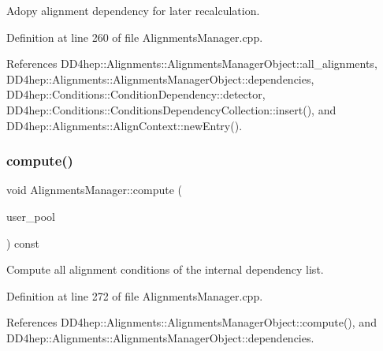 Adopy alignment dependency for later recalculation. 



Definition at line 260 of file Alignments\+Manager.\+cpp.



References D\+D4hep\+::\+Alignments\+::\+Alignments\+Manager\+Object\+::all\+\_\+alignments, D\+D4hep\+::\+Alignments\+::\+Alignments\+Manager\+Object\+::dependencies, D\+D4hep\+::\+Conditions\+::\+Condition\+Dependency\+::detector, D\+D4hep\+::\+Conditions\+::\+Conditions\+Dependency\+Collection\+::insert(), and D\+D4hep\+::\+Alignments\+::\+Align\+Context\+::new\+Entry().

\hypertarget{class_d_d4hep_1_1_alignments_1_1_alignments_manager_acc151cb6bf84d9113f6fe02463ad7c3e}{}\label{class_d_d4hep_1_1_alignments_1_1_alignments_manager_acc151cb6bf84d9113f6fe02463ad7c3e} 
\subsubsection{\texorpdfstring{compute()}{compute()}\hspace{0.1cm}{\footnotesize\ttfamily [1/2]}}
{\footnotesize\ttfamily void Alignments\+Manager\+::compute (\begin{DoxyParamCaption}\item[{\hyperlink{class_d_d4hep_1_1dd4hep__ptr}{dd4hep\+\_\+ptr}$<$ \hyperlink{class_d_d4hep_1_1_conditions_1_1_user_pool}{User\+Pool} $>$ \&}]{user\+\_\+pool }\end{DoxyParamCaption}) const}



Compute all alignment conditions of the internal dependency list. 



Definition at line 272 of file Alignments\+Manager.\+cpp.



References D\+D4hep\+::\+Alignments\+::\+Alignments\+Manager\+Object\+::compute(), and D\+D4hep\+::\+Alignments\+::\+Alignments\+Manager\+Object\+::dependencies.

\hypertarget{class_d_d4hep_1_1_alignments_1_1_alignments_manager_ac33445afaa37e1cf8e645701b4ddf0d0}{}\label{class_d_d4hep_1_1_alignments_1_1_alignments_manager_ac33445afaa37e1cf8e645701b4ddf0d0} 
